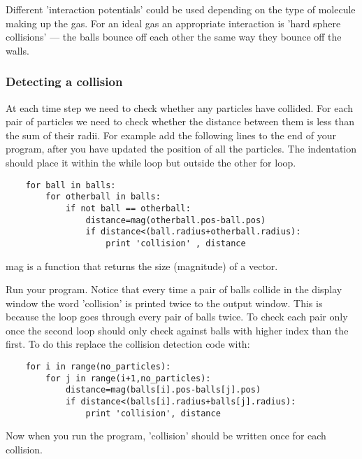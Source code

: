 \documentclass[a4paper]{letter}
\begin{document}
Different 'interaction potentials' could be used depending on the type of molecule making up 
the gas. 
For an ideal gas an appropriate interaction is 'hard sphere collisions' 
--- the balls bounce off each other the same way they bounce off the walls. 

\subsubsection{Detecting a collision}
At each time step we need to check whether any particles have collided. 
For each pair of particles we need to check whether the distance between 
them is less than the sum of their radii. 
For example add the following lines to the end of your program, 
after you have updated the position of all the particles.  
The indentation should place it within the while loop but outside the other for loop.
{\color{code}\begin{verbatim}
    for ball in balls: 
        for otherball in balls:
            if not ball == otherball:
                distance=mag(otherball.pos-ball.pos) 
                if distance<(ball.radius+otherball.radius): 
                    print 'collision' , distance
\end{verbatim}}
{\color{code}mag} is a function that returns the size (magnitude) of a vector. 

Run your program.
Notice that every time a pair of balls collide in the display window the word 'collision' 
is printed twice to the output window. 
This is because the loop goes through every pair of balls twice. 
To check each pair only once the second loop should only check against balls with 
higher index than the first. To do this replace the collision detection code with: 
{\color{code}\begin{verbatim}
    for i in range(no_particles): 
        for j in range(i+1,no_particles): 
            distance=mag(balls[i].pos-balls[j].pos) 
            if distance<(balls[i].radius+balls[j].radius): 
                print 'collision', distance 
\end{verbatim}}
Now when you run the program, 'collision' should be written once for each collision. 
  
\end{document}
